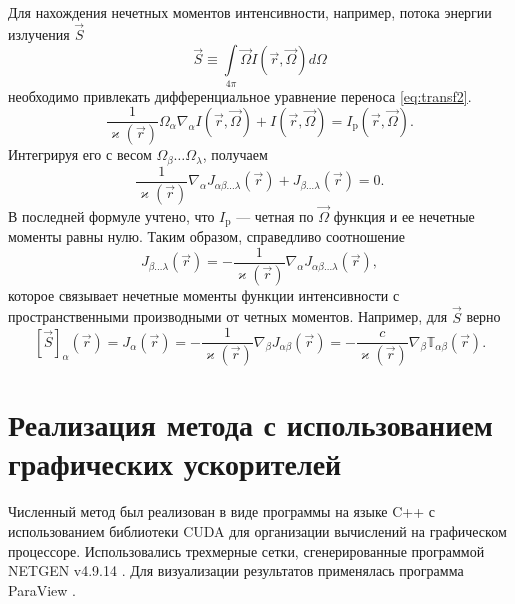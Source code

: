 Для нахождения нечетных моментов интенсивности, например, потока энергии излучения $\vec S$
\[
\vec S \equiv \int\limits_{4\pi} \vec \Omega I(\vec r, \vec \Omega) d\Omega
\]
необходимо привлекать дифференциальное уравнение переноса \eqref{eq:transf2}.
\[
\frac{1}{\varkappa(\vec r)} \Omega_\alpha \nabla_\alpha I(\vec r, \vec \Omega) + I(\vec r, \vec \Omega) = I_\text{p}(\vec r, \vec \Omega).
\]
Интегрируя его с весом $\Omega_\beta\dots\Omega_\lambda$, получаем
\[
\frac{1}{\varkappa(\vec r)} \nabla_\alpha J_{\alpha\beta\dots\lambda}(\vec r) + 
J_{\beta\dots\lambda}(\vec r) = 0.
\]
В последней формуле учтено, что $I_\text{p}$ --- четная по $\vec \Omega$ функция и ее нечетные моменты равны нулю. Таким образом, справедливо соотношение
\[
J_{\beta\dots\lambda}(\vec r) = -\frac{1}{\varkappa(\vec r)} \nabla_\alpha J_{\alpha\beta\dots\lambda}(\vec r),
\]
которое связывает нечетные моменты функции интенсивности с пространственными производными от четных моментов. Например, для $\vec S$ верно
\[
[\vec S]_\alpha(\vec r) = J_\alpha(\vec r) = -\frac{1}{\varkappa(\vec r)} \nabla_\beta J_{\alpha \beta}(\vec r) = -\frac{c}{\varkappa(\vec r)} \nabla_\beta \mathbb T_{\alpha\beta}(\vec r).
\]

\section{Реализация метода с использованием графических ускорителей}

Численный метод был реализован в виде программы на языке C++ с использованием библиотеки CUDA для организации вычислений на графическом
процессоре. Использовались трехмерные сетки, сгенерированные программой NETGEN v4.9.14 \cite{Netgen2009}.
Для визуализации результатов применялась программа ParaView \cite{Paraview2004}.

